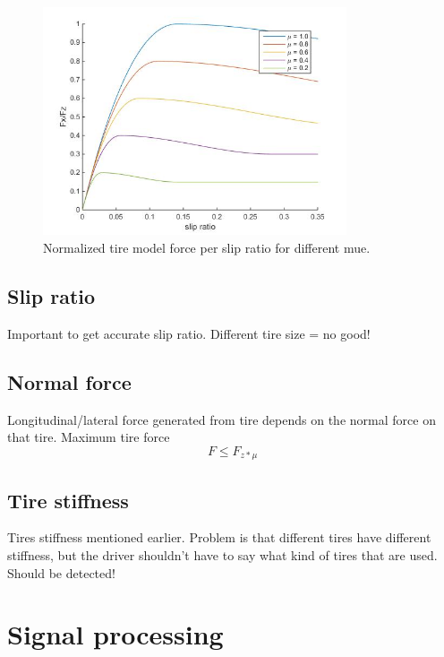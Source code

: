 \begin{figure}[h]
	\centering
	\includegraphics[width=0.8\textwidth]{Pictures/force_per_slip_different_mue}
	\caption {Normalized tire model force per slip ratio for different mue.}
	\label{force/slip}
\end{figure}

\subsection{Slip ratio}

Important to get accurate slip ratio. Different tire size = no good!



\subsection{Normal force}

Longitudinal/lateral force generated from tire depends on the normal force on that tire. Maximum tire force
\begin{equation}
	F \leq F_{z*\mu}
\end{equation}

\subsection{Tire stiffness}

Tires stiffness mentioned earlier. Problem is that different tires have different stiffness, but the driver shouldn't have to say what kind of tires that are used. Should be detected!

\section{Signal processing}

